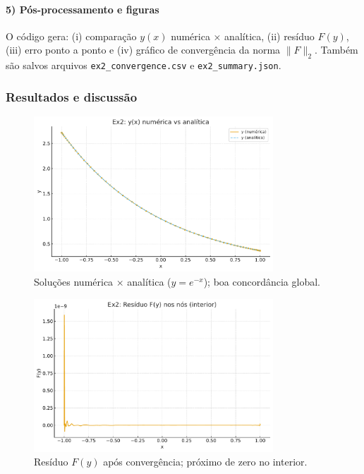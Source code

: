 \documentclass[12pt,a4paper]{article}
\begin{document}
\paragraph{5) Pós-processamento e figuras}
O código gera:  
(i) comparação \(y(x)\) numérica × analítica,  
(ii) resíduo \(F(y)\),  
(iii) erro ponto a ponto e  
(iv) gráfico de convergência da norma \(\|F\|_2\).  
Também são salvos arquivos \texttt{ex2\_convergence.csv} e \texttt{ex2\_summary.json}.

\subsubsection*{Resultados e discussão}
\begin{figure}[h!]
\centering
\includegraphics[width=0.8\textwidth]{figures/ex2_solution_compare.pdf}
\caption{Soluções numérica × analítica (\(y=e^{-x}\)); boa concordância global.}
\end{figure}

\begin{figure}[h!]
\centering
\includegraphics[width=0.8\textwidth]{figures/ex2_residual.pdf}
\caption{Resíduo \(F(y)\) após convergência; próximo de zero no interior.}
\end{figure}
\end{document}
